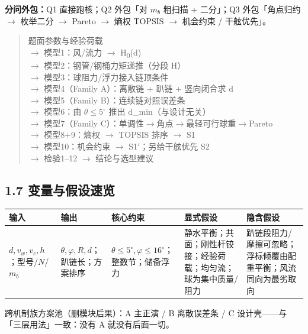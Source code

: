 \documentclass[UTF8,a4paper,zihao=-4]{ctexart}
\begin{document}
\textbf{分问外包：}Q1 直接跑核；Q2 外包「对 $m_b$ 粗扫描 + 二分」；Q3 外包「角点归约 $\to$ 枚举二分 $\to$ Pareto $\to$ 熵权 TOPSIS $\to$ 机会约束 / 干舷优先」。

\begin{quote}\small
题面参数与经验荷载\\
    $\rightarrow$ 模型1：风/流力 $\rightarrow$ H\textsubscript{0}(d)\\
    $\rightarrow$ 模型2：钢管/钢桶力矩递推（分段 H）\\
    $\rightarrow$ 模型3：球阻力/浮力接入链顶条件\\
    $\rightarrow$ 模型4（Family A）：离散链 + 趴链 + 竖向闭合求 d\\
    $\rightarrow$ 模型5（Family B）：连续链对照误差条\\
    $\rightarrow$ 模型6：由 $\theta\le 5^\circ$ 推出 d\_min（与设计无关）\\
    $\rightarrow$ 模型7（Family C）：单调性$\rightarrow$角点$\rightarrow$最轻可行球重$\rightarrow$Pareto\\
    $\rightarrow$ 模型8+9：熵权 $\rightarrow$ TOPSIS 排序 $\rightarrow$ S1\\
    $\rightarrow$ 模型10：机会约束 $\rightarrow$ S1$'$；另给干舷优先 S2\\
    $\rightarrow$ 检验1--12 $\rightarrow$ 结论与选型建议\\
\end{quote}

\subsection{\texorpdfstring{1.7 变量与假设速览}{1.7 变量与假设速览}}

\begin{center}
\begin{tabularx}{\textwidth}{|>{\raggedright\arraybackslash}X|>{\raggedright\arraybackslash}X|>{\raggedright\arraybackslash}X|>{\raggedright\arraybackslash}X|>{\raggedright\arraybackslash}X|}
\hline
\textbf{输入} & \textbf{输出} & \textbf{核心约束} & \textbf{显式假设} & \textbf{隐含假设} \\
\hline
\(d,v_w,v_c,h\)；型号/\(N\)/\(m_b\) & \(\theta,\varphi,R,d\)；趴链长；方案排序 & \(\theta\le5^\circ,\varphi\le16^\circ\)；整数节；储备浮力 & 静水平衡；共面；刚性杆铰接；经验荷载；均匀流；球为集中质量/阻力 & 趴链段阻力/摩擦可忽略；浮标倾覆由配重平衡；风流同向为最劣取向 \\
\hline
\end{tabularx}
\end{center}
\vspace{0.25em}
跨机制族方案池（删模块后果）：A 主正演 / B 离散误差条 / C 设计壳------与「三层用法」一致：没有 A 就没有后面一切。
\end{document}
